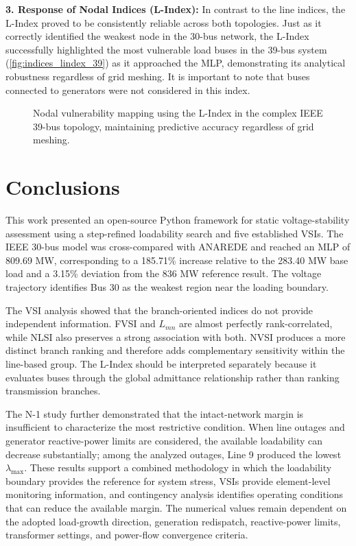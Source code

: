 \documentclass[conference]{IEEEtran}
\begin{document}
\textbf{3. Response of Nodal Indices (L-Index):}
In contrast to the line indices, the L-Index proved to be consistently reliable across both topologies. Just as it correctly identified the weakest node in the 30-bus network, the L-Index successfully highlighted the most vulnerable load buses in the 39-bus system (\autoref{fig:indices_lindex_39}) as it approached the MLP, demonstrating its analytical robustness regardless of grid meshing. It is important to note that buses connected to generators were not considered in this index.

\begin{figure}[htbp]
    \centering
    
    \caption{Nodal vulnerability mapping using the L-Index in the complex IEEE 39-bus topology, maintaining predictive accuracy regardless of grid meshing.}
    \label{fig:indices_lindex_39}
\end{figure}

\section{Conclusions}
\label{sec:conclusions}

This work presented an open-source Python framework for static voltage-stability assessment using a step-refined loadability search and five established VSIs. The IEEE 30-bus model was cross-compared with ANAREDE and reached an MLP of 809.69 MW, corresponding to a 185.71\% increase relative to the 283.40 MW base load and a 3.15\% deviation from the 836 MW reference result. The voltage trajectory identifies Bus 30 as the weakest region near the loading boundary.

The VSI analysis showed that the branch-oriented indices do not provide independent information. FVSI and $L_{mn}$ are almost perfectly rank-correlated, while NLSI also preserves a strong association with both. NVSI produces a more distinct branch ranking and therefore adds complementary sensitivity within the line-based group. The L-Index should be interpreted separately because it evaluates buses through the global admittance relationship rather than ranking transmission branches.

The N-1 study further demonstrated that the intact-network margin is insufficient to characterize the most restrictive condition. When line outages and generator reactive-power limits are considered, the available loadability can decrease substantially; among the analyzed outages, Line 9 produced the lowest $\lambda_{\max}$. These results support a combined methodology in which the loadability boundary provides the reference for system stress, VSIs provide element-level monitoring information, and contingency analysis identifies operating conditions that can reduce the available margin. The numerical values remain dependent on the adopted load-growth direction, generation redispatch, reactive-power limits, transformer settings, and power-flow convergence criteria.



\end{document}
